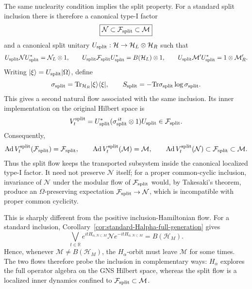 \documentclass[a4paper,11pt]{article}
\theoremstyle{definition}
\newcommand{\Tr}{\text{Tr}}
\newcommand{\Ad}{\operatorname{Ad}}
\begin{document}
The same nuclearity condition implies the split property. For a standard
split inclusion there is therefore a canonical type-I factor
\begin{equation}
    \boxed{
    \mathcal N\subset\mathcal F_{\rm split}\subset\mathcal M
    }
    \label{eq:canonical-split-factor}
\end{equation}
and a canonical split unitary
$U_{\rm split}:\mathcal H\to\mathcal H_L\otimes\mathcal H_R$ such that
\begin{equation}
    U_{\rm split}\mathcal N U_{\rm split}^*
    =\mathcal N_L\otimes1,
    \qquad
    U_{\rm split}\mathcal F_{\rm split}U_{\rm split}^*
    =B(\mathcal H_L)\otimes1,
    \qquad
    U_{\rm split}\mathcal M'U_{\rm split}^*
    =1\otimes\mathcal M_R'.
    \label{eq:canonical-split-representation}
\end{equation}
Writing $|\xi\rangle=U_{\rm split}|\Omega\rangle$, define
\begin{equation}
    \sigma_{\rm split}
    =\Tr_{\mathcal H_R}|\xi\rangle\langle\xi|,
    \qquad
    S_{\rm split}=-\Tr\sigma_{\rm split}\log\sigma_{\rm split}.
    \label{eq:sigma-split-definition}
\end{equation}
This gives a second natural flow associated with the same inclusion. Its inner
implementation on the original Hilbert space is
\begin{equation}
    V_t^{\rm split}
    =U_{\rm split}^*
      (\sigma_{\rm split}^{\,it}\otimes1)
      U_{\rm split}
    \in\mathcal F_{\rm split}.
    \label{eq:split-inner-dynamics}
\end{equation}
Consequently,
\begin{equation}
    \Ad V_t^{\rm split}(\mathcal F_{\rm split})
    =\mathcal F_{\rm split},
    \qquad
    \Ad V_t^{\rm split}(\mathcal M)=\mathcal M,
    \qquad
    \Ad V_t^{\rm split}(\mathcal N)
    \subset\mathcal F_{\rm split}\subset\mathcal M.
    \label{eq:split-dynamics-localized}
\end{equation}
Thus the split flow keeps the transported subsystem inside the canonical
localized type-I factor. It need not preserve $\mathcal N$ itself; for a
proper common-cyclic inclusion, invariance of $\mathcal N$ under the modular
flow of $\mathcal F_{\rm split}$ would, by Takesaki's theorem, produce an
$\Omega$-preserving expectation $\mathcal F_{\rm split}\to\mathcal N$, which
is incompatible with proper common cyclicity.

This is sharply different from the positive inclusion-Hamiltonian flow. For
a standard inclusion, Corollary~\ref{cor:standard-Halpha-full-generation}
gives
\begin{equation}
    \bigvee_{t\in\mathbb R}
    e^{itH_{\alpha,N\subset M}}\mathcal N
    e^{-itH_{\alpha,N\subset M}}
    =B(\mathcal H_M).
    \label{eq:Hinc-does-not-preserve-N}
\end{equation}
Hence, whenever $\mathcal M\neq B(\mathcal H_M)$, the $H_\alpha$-orbit must
leave $\mathcal M$ for some times. The two flows therefore probe the inclusion
in complementary ways: $H_\alpha$ explores the full operator algebra on the
GNS Hilbert space, whereas the split flow is a localized inner dynamics
confined to $\mathcal F_{\rm split}\subset\mathcal M$.
\end{document}
